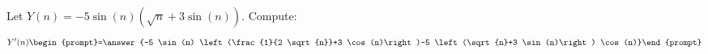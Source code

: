 \documentclass{ximera}
\author{Bart Snapp}
\begin{document}
\begin{exercise}
Let $Y(n) = -5 \sin (n) \left(\sqrt{n}+3 \sin (n)\right)$. Compute:
\[
Y'(n)
\begin{prompt}=\answer{-5 \sin (n) \left(\frac{1}{2 \sqrt{n}}+3 \cos (n)\right)-5 \left(\sqrt{n}+3 \sin (n)\right) \cos (n)}\end{prompt}
\]
\end{exercise}
\end{document}
